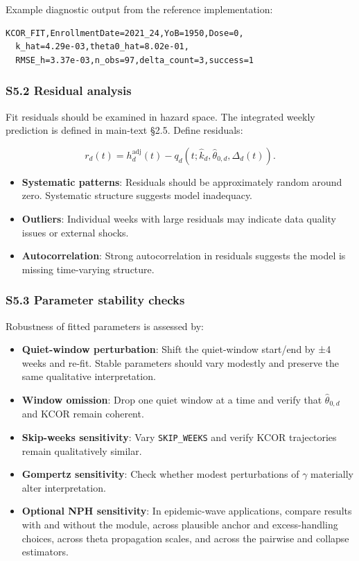 \documentclass[
]{article}
\providecommand{\tightlist}{%
  \setlength{\itemsep}{0pt}\setlength{\parskip}{0pt}}
\begin{document}
Example diagnostic output from the reference implementation:

\begin{verbatim}
KCOR_FIT,EnrollmentDate=2021_24,YoB=1950,Dose=0,
  k_hat=4.29e-03,theta0_hat=8.02e-01,
  RMSE_h=3.37e-03,n_obs=97,delta_count=3,success=1
\end{verbatim}

\subsubsection{S5.2 Residual analysis}\label{s5.2-residual-analysis}

Fit residuals should be examined in hazard space. The integrated weekly prediction is defined in main-text §2.5. Define residuals:

\[r_{d}(t)=h_d^{\mathrm{adj}}(t)-q_d(t;\hat{k}_d,\hat{\theta}_{0,d},\Delta_d(t)).\]

\begin{itemize}
\tightlist
\item
  \textbf{Systematic patterns}: Residuals should be approximately random around zero. Systematic structure suggests model inadequacy.
\item
  \textbf{Outliers}: Individual weeks with large residuals may indicate data quality issues or external shocks.
\item
  \textbf{Autocorrelation}: Strong autocorrelation in residuals suggests the model is missing time-varying structure.
\end{itemize}

\subsubsection{S5.3 Parameter stability checks}\label{s5.3-parameter-stability-checks}

Robustness of fitted parameters is assessed by:

\begin{itemize}
\tightlist
\item
  \textbf{Quiet-window perturbation}: Shift the quiet-window start/end by ±4 weeks and re-fit. Stable parameters should vary modestly and preserve the same qualitative interpretation.
\item
  \textbf{Window omission}: Drop one quiet window at a time and verify that \(\hat{\theta}_{0,d}\) and KCOR remain coherent.
\item
  \textbf{Skip-weeks sensitivity}: Vary \texttt{SKIP\_WEEKS} and verify KCOR trajectories remain qualitatively similar.
\item
  \textbf{Gompertz sensitivity}: Check whether modest perturbations of \(\gamma\) materially alter interpretation.
\item
  \textbf{Optional NPH sensitivity}: In epidemic-wave applications, compare results with and without the module, across plausible anchor and excess-handling choices, across theta propagation scales, and across the pairwise and collapse estimators.
\end{itemize}
\end{document}
